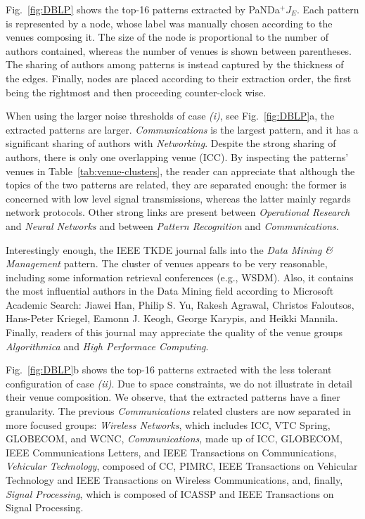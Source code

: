 \documentclass{article}
\newcommand{\myalgostyle}[1]  {{\sc #1}\xspace}
\newcommand{\pandaplus}        {\myalgostyle{PaNDa$^+$}}
\begin{document}
Fig.~\ref{fig:DBLP} shows the top-16 patterns extracted by \pandaplus $J_E$.
Each pattern is represented by a node, whose label was manually chosen according to the venues composing it.
The size of the node is proportional to the number of authors contained, 
whereas the number of venues is shown between parentheses.
The sharing of authors among patterns is instead captured by the thickness of the edges.
Finally, nodes are placed according to their extraction order, the first being the rightmost and then proceeding counter-clock wise.

When using the larger noise thresholds of case \emph{(i)}, see Fig.~\ref{fig:DBLP}a,
the extracted patterns are larger. 
\emph{Communications} is the largest pattern, and it has a significant sharing of authors with \emph{Networking}.
Despite the strong sharing of authors, there is only one overlapping venue (ICC). 
By inspecting the patterns' venues in Table~\ref{tab:venue-clusters}, the reader can appreciate  that although the topics of the two patterns are related, they are separated enough: the former is concerned with low level signal transmissions, whereas the latter mainly regards network protocols.
Other strong links are present between {\em Operational Research} and {\em Neural Networks} and between {\em Pattern Recognition} and {\em Communications}.

Interestingly enough, the IEEE TKDE journal falls into the \emph{Data Mining \& Management} pattern.
The cluster of venues appears to be very reasonable, including some information retrieval conferences (e.g., WSDM).
Also, it contains the most influential authors in the Data Mining field according to Microsoft Academic Search: Jiawei Han, Philip S. Yu, Rakesh Agrawal, Christos Faloutsos, Hans-Peter Kriegel, Eamonn J. Keogh, George Karypis, and Heikki Mannila.
Finally,  readers of this journal may appreciate the quality of the venue groups \emph{Algorithmica} and 
\emph{High Performace Computing}.

Fig.~\ref{fig:DBLP}b shows the top-16 patterns extracted with the less tolerant configuration of case \emph{(ii)}. 
Due to space constraints, we do not illustrate in detail their venue composition.
We observe, that the extracted patterns have a finer granularity.
The previous {\em Communications} related clusters are now separated in more focused groups:
 \emph{Wireless Networks}, which includes ICC,  VTC Spring, GLOBECOM,  and WCNC, 
\emph{Communications}, made up of ICC, GLOBECOM, IEEE Communications Letters, and 
IEEE Transactions on Communications,  
\emph{Vehicular Technology}, composed of CC, PIMRC,  IEEE Transactions on Vehicular Technology and IEEE Transactions on Wireless Communications, and, finally, 
\emph{Signal Processing}, which is composed of ICASSP and IEEE Transactions on Signal Processing.
\end{document}
